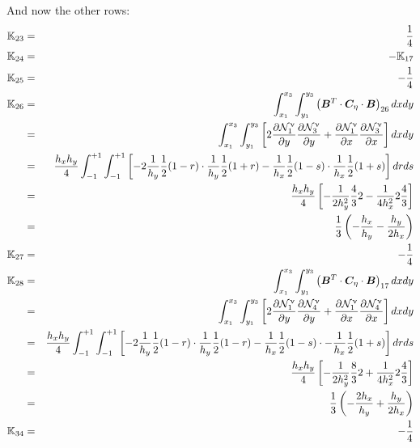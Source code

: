 \newpage
And now the other rows:
\begin{eqnarray}
\K_{23} &=& \frac14 \nn\\
\K_{24} &=& -\K_{17} \nn\\
\K_{25} &=& -\frac14 \nn\\
\K_{26} 
&=& \int_{x_1}^{x_3} \int_{y_1}^{y_3} 
\left({\bm B}^T \cdot {\bm C}_\eta \cdot {\bm B}\right)_{26} dx dy \nn\\
&=& \int_{x_1}^{x_3} \int_{y_1}^{y_3}
\left[
2\frac{\partial \bN_1^\upnu}{\partial y}\frac{\partial \bN_3^\upnu}{\partial y} 
+\frac{\partial \bN_1^\upnu}{\partial x}\frac{\partial \bN_3^\upnu}{\partial x}
\right] dxdy \nn\\
&=& \frac{h_xh_y}{4} \int_{-1}^{+1} \int_{-1}^{+1} 
\left[ 
-2 \frac{1}{h_y}\frac12 (1-r)\cdot  \frac{1}{h_y}\frac12 (1+r)
-\frac{1}{h_x}\frac12 (1-s) \cdot \frac{1}{h_x}\frac12 (1+s) 
\right] drds \nn\\
&=& \frac{h_xh_y}{4}
\left[
-\frac{1}{2h_y^2} \frac43 2
-\frac{1}{4h_x^2} 2 \frac43
\right] \nn\\
&=& \frac13 \left( -\frac{h_x}{h_y} - \frac{h_y}{2h_x} \right) \nn\\
\K_{27} &=& -\frac14 \nn\\
\K_{28}
&=& \int_{x_1}^{x_3} \int_{y_1}^{y_3} 
\left({\bm B}^T \cdot {\bm C}_\eta \cdot {\bm B}\right)_{17} dx dy \nn\\
&=& \int_{x_1}^{x_3} \int_{y_1}^{y_3}
\left[
2\frac{\partial \bN_1^\upnu}{\partial y}\frac{\partial \bN_4^\upnu}{\partial y} 
+\frac{\partial \bN_1^\upnu}{\partial x}\frac{\partial \bN_4^\upnu}{\partial x}
\right] dxdy \nn\\
&=& \frac{h_xh_y}{4} \int_{-1}^{+1} \int_{-1}^{+1} 
\left[ 
-2 \frac{1}{h_y}\frac12 (1-r)\cdot  \frac{1}{h_y}\frac12 (1-r)
-\frac{1}{h_x}\frac12 (1-s) \cdot -\frac{1}{h_x}\frac12 (1+s) 
\right] drds \nn\\
&=& \frac{h_xh_y}{4} 
\left[
-\frac{1}{2h_y^2} \frac83 2 + \frac{1}{4h_x^2} 2 \frac43 
\right] \nn\\
&=& \frac{1}{3} \left(-\frac{2h_x}{h_y} + \frac{h_y}{2h_x} \right) \nn\\
\K_{34} &=& -\frac14 \nn\\

\end{eqnarray}
